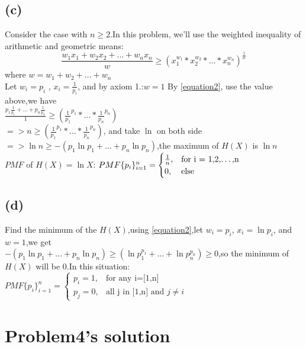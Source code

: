 \documentclass[a4paper,11pt]{article} %
\begin{document}
\subsection{(c)}
Consider the case with $n \geq 2$.In this problem, we'll use the weighted inequality of arithmetic and geometric means:
\begin{equation}
\label{equation2}
    \frac{w_1x_1+w_2x_2+\dots+w_nx_n}{w} \geq (x_1^{w_1}*x_2^{w_2}*\dots *x_n^{w_n})^{\frac{1}{w}}
\end{equation}
where $w=w_1+w_2+\dots+w_n$\\
Let $w_i=p_i$ , $x_i = \frac{1}{p_i}$, and by axiom 1.:$w=1$
By \eqref{equation2}, use the value above,we have\\
$\frac{p_1\frac{1}{p_1}+\dots+p_n\frac{1}{p_n}}{1} \geq (\frac{1}{p_1}^{p_1}*\dots*\frac{1}{p_n}^{p_n})$\\
$=>n \geq (\frac{1}{p_1}^{p_1}*\dots*\frac{1}{p_n}^{p_n})$, and take $\ln$ on both side\\
$=>\ln n \geq -(p_1\ln p_1 + \dots +p_n\ln p_n)$,the maximum of $H(X)$ is $\ln n$\\
$PMF$ of $H(X)=\ln X$:
$PMF \{p_i\}_{i=1}^{n}=\begin{cases}
    \frac{1}{n},&\text{for i = 1,2,\dots ,n}\\
    0,&\text{else}
\end{cases}$
\subsection{(d)}
Find the minimum of the $H(X)$,using \eqref{equation2},let $w_i=p_i$, $x_i=\ln p_i$, and $w=1$,we get\\
$-(p_1\ln p_1+\dots+p_n\ln p_n)\geq (\ln p_1^{p_1}+\dots+\ln p_n^{p_n}) \geq 0$,so the minimum of $H(X)$ will be 0.In this situation:\\
$PMF \{p_i\}_{i=1}^{n}=\begin{cases}
    p_i=1,&\text{for any i=[1,n]}\\
    p_j=0,&\text{all j in [1,n] and $j \neq i$}  
\end{cases}$

\section{Problem4's solution}
\end{document}
